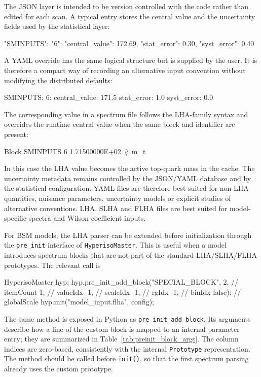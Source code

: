 \documentclass[preprint,11pt]{elsarticle}
\begin{document}
The JSON layer is intended to be version controlled with the code rather than edited for each scan.  A typical entry stores the central value and the uncertainty fields used by the statistical layer:
\begin{jsoncode}
{
  "SMINPUTS": {
    "6": {
      "central_value": 172.69,
      "stat_error": 0.30,
      "syst_error": 0.40
    }
  }
}
\end{jsoncode}
A YAML override has the same logical structure but is supplied by the user.  It is therefore a compact way of recording an alternative input convention without modifying the distributed defaults:
\begin{yamlcode}
SMINPUTS:
  6:
    central_value: 171.5
    stat_error: 1.0
    syst_error: 0.0
\end{yamlcode}
The corresponding value in a spectrum file follows the LHA-family syntax and overrides the runtime central value when the same block and identifier are present:
\begin{lhacode}
Block SMINPUTS
    6   1.71500000E+02   # m_t
\end{lhacode}
In this case the LHA value becomes the active top-quark mass in the cache.  The uncertainty metadata remains controlled by the JSON/YAML database and by the statistical configuration.  YAML files are therefore best suited for non-LHA quantities, nuisance parameters, uncertainty models or explicit studies of alternative conventions.  LHA, SLHA and FLHA files are best suited for model-specific spectra and Wilson-coefficient inputs.

For BSM models, the LHA parser can be extended before initialization through the \texttt{pre\_init} interface of \texttt{HyperisoMaster}.  This is useful when a model introduces spectrum blocks that are not part of the standard LHA/SLHA/FLHA prototypes.  The relevant call is
\begin{cppcode}
HyperisoMaster hyp;
hyp.pre_init_add_block("SPECIAL_BLOCK",
                       2,   // itemCount
                       1,   // valueIdx
                      -1,   // scaleIdx
                      -1,   // rgIdx
                      -1,   // binIdx
                       false); // globalScale
hyp.init("model_input.flha", config);
\end{cppcode}
The same method is exposed in Python as \texttt{pre\_init\_add\_block}.  Its arguments describe how a line of the custom block is mapped to an internal parameter entry; they are summarized in Table~\ref{tab:preinit_block_args}.  The column indices are zero-based, consistently with the internal \texttt{Prototype} representation.  The method should be called before \texttt{init()}, so that the first spectrum parsing already uses the custom prototype.
\end{document}
